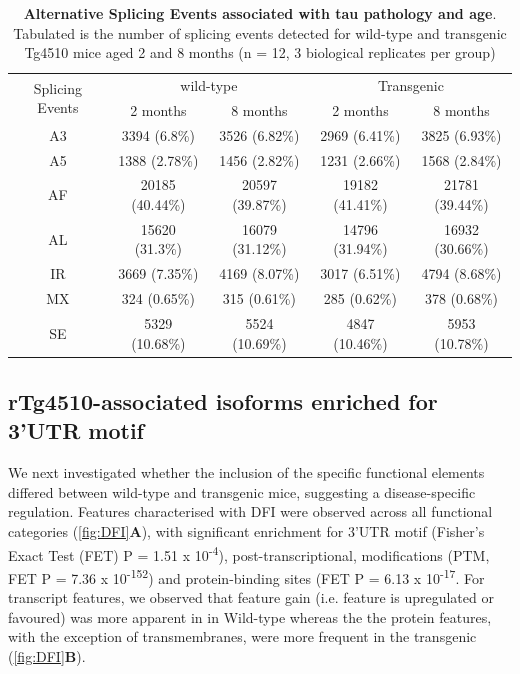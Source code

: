 \vspace{0.5cm}
\begin{table}[!htp]
	\centering
	\captionsetup{width=1\textwidth}
	\caption[Alternative Splicing Events associated with tau pathology and age]%
	{\textbf{Alternative Splicing Events associated with tau pathology and age}. Tabulated is the number of splicing events detected for wild-type and transgenic Tg4510 mice aged 2 and 8 months (n = 12, 3 biological replicates per group)}
	\begin{tabular}{@{}ccccc@{}}
		\toprule
		\multirow{2}{*}{Splicing Events} & \multicolumn{2}{c}{wild-type} & \multicolumn{2}{c}{Transgenic} \\ \cmidrule(l){2-5} 
		& 2 months        & 8 months        & 2 months        & 8 months        \\ \midrule
		A3 & 3394 (6.8\%)    & 3526 (6.82\%)   & 2969 (6.41\%)   & 3825 (6.93\%)   \\
		A5 & 1388 (2.78\%)   & 1456 (2.82\%)   & 1231 (2.66\%)   & 1568 (2.84\%)   \\
		AF & 20185 (40.44\%) & 20597 (39.87\%) & 19182 (41.41\%) & 21781 (39.44\%) \\
		AL & 15620 (31.3\%)  & 16079 (31.12\%) & 14796 (31.94\%) & 16932 (30.66\%) \\
		IR & 3669 (7.35\%)   & 4169 (8.07\%)   & 3017 (6.51\%)   & 4794 (8.68\%)   \\
		MX & 324 (0.65\%)    & 315 (0.61\%)    & 285 (0.62\%)    & 378 (0.68\%)    \\
		SE & 5329 (10.68\%)  & 5524 (10.69\%)  & 4847 (10.46\%)  & 5953 (10.78\%)  \\ \bottomrule
	\end{tabular}
	\label{AS_WholeTranscriptome_diff}
\end{table}

\subsection{rTg4510-associated isoforms enriched for 3'UTR motif}
We next investigated whether the inclusion of the specific functional elements differed between wild-type and transgenic mice, suggesting a disease-specific regulation. Features characterised with DFI were observed across all functional categories (\cref{fig:DFI}\textbf{A}), with significant enrichment for 3'UTR motif (Fisher's Exact Test (FET) P = 1.51 x 10\textsuperscript{-4}), post-transcriptional,  modifications (PTM, FET P = 7.36 x 10\textsuperscript{-152}) and protein-binding sites (FET P = 6.13 x 10\textsuperscript{-17}. For transcript features, we observed that feature gain (i.e. feature is upregulated or favoured) was more apparent in in Wild-type whereas the the protein features, with the exception of transmembranes, were more frequent in the transgenic (\cref{fig:DFI}\textbf{B}). 


